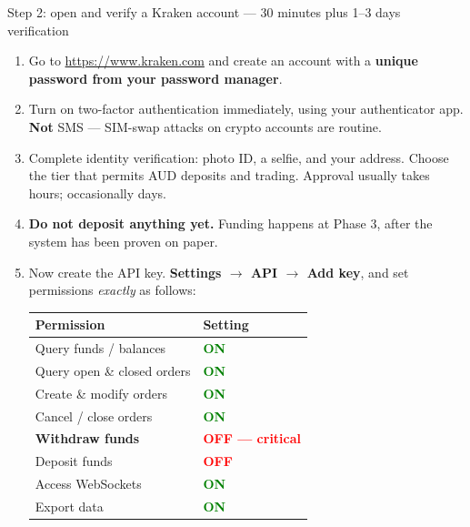 \documentclass[11pt,a4paper]{article}
\begin{document}
\begin{kimbox}{Step 2: open and verify a Kraken account --- 30 minutes plus 1--3 days verification}
\begin{enumerate}[leftmargin=1.6em, itemsep=3pt]
    \item Go to \url{https://www.kraken.com} and create an account with
          a \textbf{unique password from your password manager}.
    \item Turn on two-factor authentication immediately, using your
          authenticator app. \textbf{Not} SMS --- SIM-swap attacks on
          crypto accounts are routine.
    \item Complete identity verification: photo ID, a selfie, and your
          address. Choose the tier that permits AUD deposits and
          trading. Approval usually takes hours; occasionally days.
    \item \textbf{Do not deposit anything yet.} Funding happens at
          Phase 3, after the system has been proven on paper.
    \item Now create the API key. \textbf{Settings $\rightarrow$ API
          $\rightarrow$ Add key}, and set permissions
          \emph{exactly} as follows:

          \vspace{0.4em}
          \begin{tabular}{@{}ll@{}}
              \toprule
              \textbf{Permission} & \textbf{Setting} \\
              \midrule
              Query funds / balances       & \textcolor{green}{\textbf{ON}} \\
              Query open \& closed orders  & \textcolor{green}{\textbf{ON}} \\
              Create \& modify orders      & \textcolor{green}{\textbf{ON}} \\
              Cancel / close orders        & \textcolor{green}{\textbf{ON}} \\
              \textbf{Withdraw funds}      & \textcolor{red}{\textbf{OFF --- critical}} \\
              Deposit funds                & \textcolor{red}{\textbf{OFF}} \\
              Access WebSockets            & \textcolor{green}{\textbf{ON}} \\
              Export data                  & \textcolor{green}{\textbf{ON}} \\
              \bottomrule
          \end{tabular}


\end{enumerate}
\end{kimbox}
\end{document}
